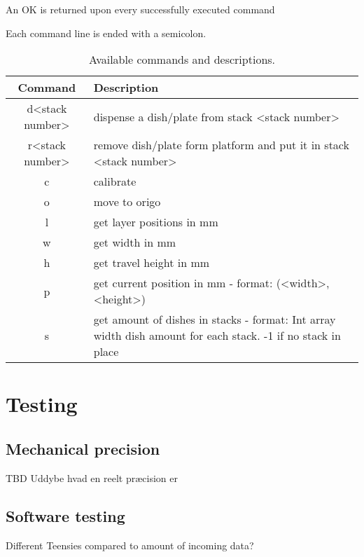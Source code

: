 \documentclass{sigchi}
\begin{document}
		An OK is returned upon every successfully executed command
		
		
	
	
	Each command line is ended with a semicolon.
	\begin{table}
	\begin{center}
	 \begin{tabular}{|| c | p{5cm} ||} 
	 \hline
	 Command & Description\\ [0.5ex] 
	 \hline\hline
	 d\textless stack number\textgreater  & dispense a dish/plate from stack \textless stack number\textgreater  \\ 
	 \hline
	 r\textless stack number\textgreater & remove dish/plate form platform and put it in stack \textless stack number\textgreater \\
	 \hline
	 c & calibrate \\
	 \hline
	 o & move to origo \\
	 \hline
	 l & get layer positions in mm \\
	 \hline
	 w & get width in mm \\
	 \hline
	 h & get travel height in mm \\ %
	 \hline
	 p & get current position in mm - format: (\textless width\textgreater ,\textless height\textgreater ) \\
	 \hline
	 s & get amount of dishes in stacks - format: Int array width dish amount for each stack. -1 if no stack in place\\ [1ex] 
	 \hline
	\end{tabular}
	\end{center}
	\caption{Available commands and descriptions.} \label{table:commands}
	\end{table}	

	\section{Testing}
	\subsection{Mechanical precision}
	TBD
	Uddybe hvad en reelt præcision er
	
	
	\subsection{Software testing}
	Different Teensies compared to amount of incoming data?
	
\end{document}
